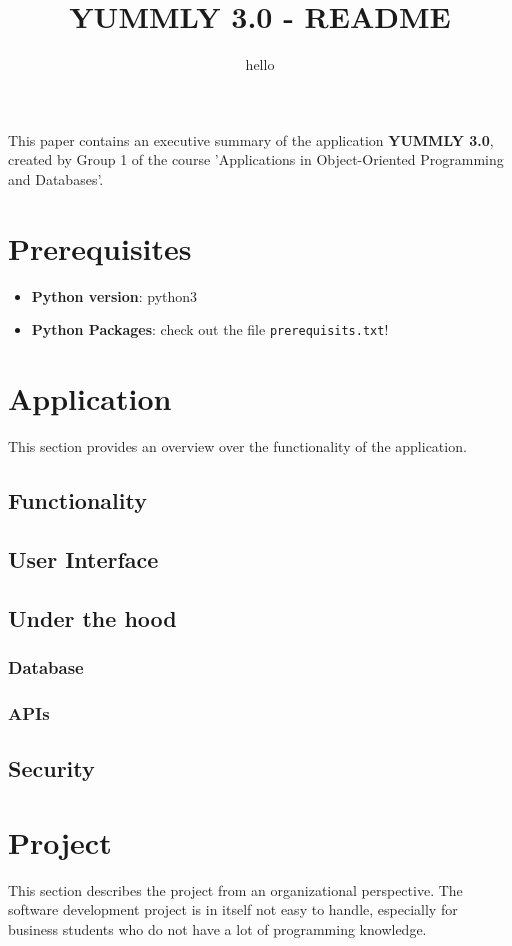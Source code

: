 \documentclass[11pt,a4paper,notitlepage]{article}
\title{YUMMLY 3.0 -  README}
\subtitle{hello}
\date{\vspace{-5ex}}
\author{\vspace{-5ex}}
\begin{document}
\maketitle
\thispagestyle{fancy}

This paper contains an executive summary of the application \textbf{ YUMMLY 3.0}, created by Group 1 of the course 'Applications in Object-Oriented Programming and Databases'.

\section*{Prerequisites}
\begin{itemize}  
\item\textbf{Python version}: python3
\item \textbf{Python Packages}: check out the file \texttt{prerequisits.txt}!
\end{itemize}
 
\section*{Application}
This section provides an overview over the functionality of the application.
\subsection*{Functionality}
\subsection*{User Interface}
\subsection*{Under the hood}
\subsubsection*{Database}
\subsubsection*{APIs}
\subsection*{Security}

\section*{Project}
This section describes the project from an organizational perspective. The software development project is in itself not easy to handle, especially for business students who do not have a lot of programming knowledge. 
\end{document}
